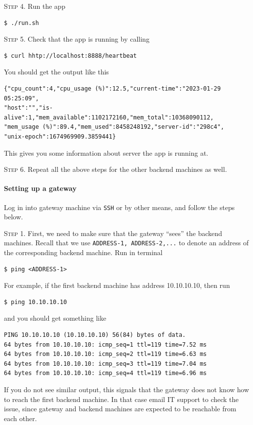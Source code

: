 \documentclass{article}
\begin{document}
\vspace{0.5cm}

\textsc{Step 4}. Run the app
\begin{lstlisting}
$ ./run.sh
\end{lstlisting}

\vspace{0.5cm}

\textsc{Step 5}. Check that the app is running by calling
\begin{lstlisting}
$ curl hhtp://localhost:8888/heartbeat
\end{lstlisting}
You should get the output like this
\begin{lstlisting}
{"cpu_count":4,"cpu_usage (%)":12.5,"current-time":"2023-01-29 05:25:09",
"host":"","is-alive":1,"mem_available":1102172160,"mem_total":10368090112,
"mem_usage (%)":89.4,"mem_used":8458248192,"server-id":"298c4",
"unix-epoch":1674969909.3859441}
\end{lstlisting}
This gives you some information about server the app is running at.

\vspace{0.5cm}
\textsc{Step 6}. Repeat all the above steps for the other backend machines as well.

\vspace{0.25cm}

\paragraph{Setting up a gateway} Log in into gateway machine via \texttt{SSH} or by other means, and follow the steps below.

\vspace{0.25cm}

\textsc{Step 1}. First, we need to make sure that the gateway ``sees'' the backend machines. Recall that we use \texttt{ADDRESS-1, ADDRESS-2,...} to denote an address of the corresponding backend machine. Run in terminal
\begin{lstlisting}
$ ping <ADDRESS-1>
\end{lstlisting}
For example, if the first backend machine has address 10.10.10.10, then run
\begin{lstlisting}
$ ping 10.10.10.10
\end{lstlisting}
and you should get something like
\begin{lstlisting}
PING 10.10.10.10 (10.10.10.10) 56(84) bytes of data.
64 bytes from 10.10.10.10: icmp_seq=1 ttl=119 time=7.52 ms
64 bytes from 10.10.10.10: icmp_seq=2 ttl=119 time=6.63 ms
64 bytes from 10.10.10.10: icmp_seq=3 ttl=119 time=7.04 ms
64 bytes from 10.10.10.10: icmp_seq=4 ttl=119 time=6.96 ms
\end{lstlisting}
If you do not see similar output, this signals that the gateway does not know how to reach the first backend machine. In that case email IT support to check the issue, since gateway and backend machines are expected to be reachable from each other. 
\end{document}
